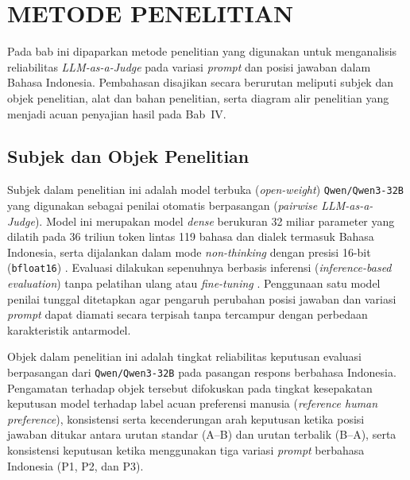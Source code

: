 \chapter{METODE PENELITIAN}

Pada bab ini dipaparkan metode penelitian yang digunakan untuk menganalisis reliabilitas \textit{LLM-as-a-Judge} pada variasi \textit{prompt} dan posisi jawaban dalam Bahasa Indonesia. Pembahasan disajikan secara berurutan meliputi subjek dan objek penelitian, alat dan bahan penelitian, serta diagram alir penelitian yang menjadi acuan penyajian hasil pada Bab~IV.

\section{Subjek dan Objek Penelitian}

Subjek dalam penelitian ini adalah model terbuka (\textit{open-weight}) \texttt{Qwen/\allowbreak Qwen3-\allowbreak 32B} \cite{yangQwen3TechnicalReport2025} yang digunakan sebagai penilai otomatis berpasangan (\textit{pairwise LLM-as-a-Judge}). Model ini merupakan model \textit{dense} berukuran 32 miliar parameter yang dilatih pada 36 triliun token lintas 119 bahasa dan dialek termasuk Bahasa Indonesia, serta dijalankan dalam mode \textit{non-thinking} dengan presisi 16-bit (\texttt{bfloat16}) \cite{yangQwen3TechnicalReport2025}. Evaluasi dilakukan sepenuhnya berbasis inferensi (\textit{inference-based evaluation}) tanpa pelatihan ulang atau \textit{fine-tuning} \cite{guSurveyLLMasaJudge2025}. Penggunaan satu model penilai tunggal ditetapkan agar pengaruh perubahan posisi jawaban dan variasi \textit{prompt} dapat diamati secara terpisah tanpa tercampur dengan perbedaan karakteristik antarmodel.

Objek dalam penelitian ini adalah tingkat reliabilitas keputusan evaluasi berpasangan dari \texttt{Qwen/\allowbreak Qwen3-\allowbreak 32B} pada pasangan respons berbahasa Indonesia. Pengamatan terhadap objek tersebut difokuskan pada tingkat kesepakatan keputusan model terhadap label acuan preferensi manusia (\textit{reference human preference}), konsistensi serta kecenderungan arah keputusan ketika posisi jawaban ditukar antara urutan standar (A--B) dan urutan terbalik (B--A), serta konsistensi keputusan ketika menggunakan tiga variasi \textit{prompt} berbahasa Indonesia (P1, P2, dan P3).

